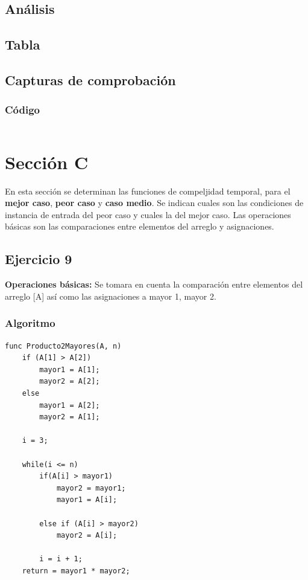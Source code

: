 \documentclass[12pt]{article}
\begin{document}
    		\subsection{Análisis}

    		\subsection{Tabla}
	        
	        \subsection{Capturas de comprobación}

	        \subsubsection{Código}
	            \begin{lstlisting}[style=Java]
    		    \end{lstlisting}

\newpage
	\section{Sección C}
	En esta sección se determinan las funciones de compeljidad temporal, para el \textbf{mejor caso}, \textbf{peor caso} y \textbf{caso medio}. Se indican cuales son las condiciones de instancia de entrada del peor caso y cuales la del mejor caso.
	Las operaciones básicas son las comparaciones entre elementos del arreglo y asignaciones.


    	\subsection{Ejercicio 9}
			\textbf{Operaciones básicas:} Se tomara en cuenta la comparación entre elementos del arreglo [A] así como las asignaciones a mayor 1, mayor 2. 
			\subsubsection{Algoritmo}
			    \begin{lstlisting}[style=Java]
func Producto2Mayores(A, n)
	if (A[1] > A[2])
		mayor1 = A[1];
		mayor2 = A[2];
	else
		mayor1 = A[2];
		mayor2 = A[1];

	i = 3;

	while(i <= n)
		if(A[i] > mayor1)
			mayor2 = mayor1;
			mayor1 = A[i];

		else if (A[i] > mayor2)
			mayor2 = A[i];

		i = i + 1;
	return = mayor1 * mayor2;
		    \end{lstlisting}
\end{document}
